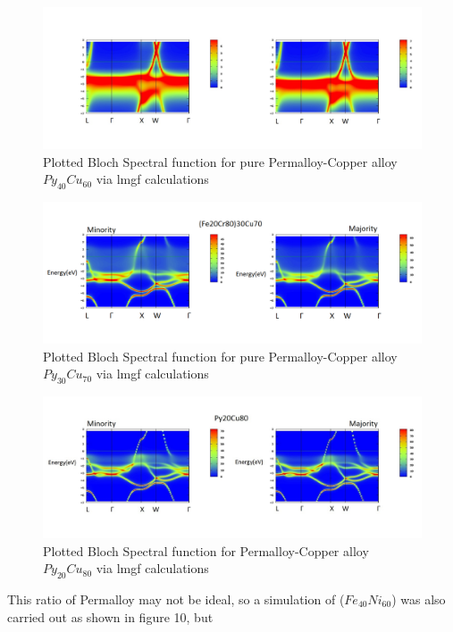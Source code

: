 \documentclass[12pt]{article}
\begin{document}
\begin{figure}[h!]
    \centering
    \begin{measuredfigure}
    \includegraphics[scale=0.40]{specfunc/cu60}
    \caption{Plotted Bloch Spectral function for pure Permalloy-Copper alloy $Py_{40}Cu_{60}$ via lmgf calculations}
    \end{measuredfigure}
    \end{figure}
\begin{figure}[htp]
    \centering
    \begin{measuredfigure}
    \includegraphics[scale=0.40]{specfunc/cu70}
    \caption{Plotted Bloch Spectral function for pure Permalloy-Copper alloy $Py_{30}Cu_{70}$ via lmgf calculations}
    \end{measuredfigure}
    \end{figure}
\begin{figure}[htp]
    \centering
    \begin{measuredfigure}
    \includegraphics[scale=0.40]{specfunc/cu80}
    \caption{Plotted Bloch Spectral function for Permalloy-Copper alloy $Py_{20}Cu_{80}$ via lmgf calculations}
    \end{measuredfigure}
    \end{figure}
\clearpage
This ratio of Permalloy may not be ideal, so a simulation of ($Fe_{40}Ni_{60}$) was also carried out as shown in figure 10, but 
\end{document}
